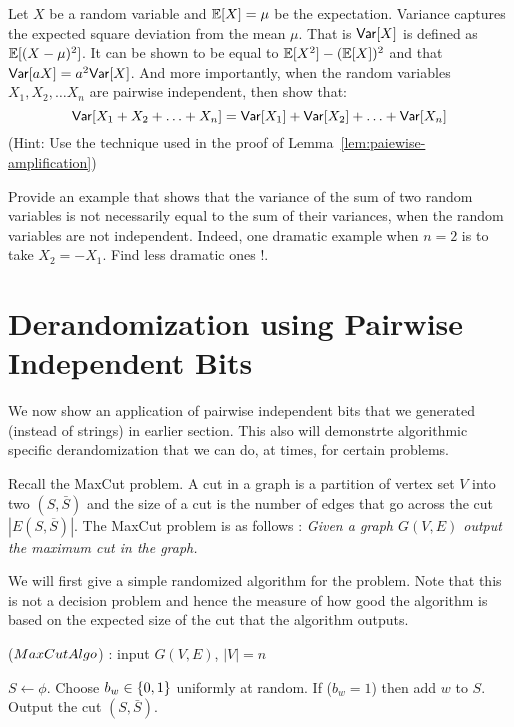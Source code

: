 \begin{exercise}
Let $X$ be a random variable and ${\mathbb E}[X] = \mu$ be the expectation. Variance captures the expected square deviation from the mean $\mu$. That is $\mathsf{Var}[X]$ is defined as ${\mathbb E}[(X-\mu)^2]$. It can be shown to be equal to ${\mathbb E}[X^2]-({\mathbb E}[X])^2$ and that $\mathsf{Var}[aX] = a^2\mathsf{Var}[X]$. And more importantly, when the random variables $X_1, X_2, \ldots X_n$ are pairwise independent, then show that:
$$\mathsf{Var}[X_1+X_2+\ldots+X_n] = \mathsf{Var}[X_1]+\mathsf{Var}[X_2]+\ldots+\mathsf{Var}[X_n]$$
(Hint: Use the technique used in the proof of Lemma~\ref{lem:paiewise-amplification})

Provide an example that shows that the variance of the sum of two random variables is not necessarily equal to the sum of their variances, when the random variables are not independent. Indeed, one dramatic example when $n=2$ is to take $X_2 = -X_1$. Find less dramatic ones !.
\end{exercise}


\section{Derandomization using Pairwise Independent Bits}

We now show an application of pairwise independent bits that we generated (instead of strings) in earlier section. This also will demonstrte algorithmic specific derandomization that we can do, at times, for certain problems. 

Recall the {\sc MaxCut} problem. A cut in a graph is a partition of vertex set $V$ into two $(S,\bar{S})$ and the size of a cut is the number of edges that go across the cut $|E(S,\overline{S})|$. The {\sc MaxCut} problem is as follows : \textit{Given a graph $G(V,E)$ output the maximum cut in the graph.}

We will first give a simple randomized algorithm for the problem. Note that this is not a decision problem and hence the measure of how good the algorithm is based on the expected size of the cut that the algorithm outputs.

\begin{algorithm}
\label{alg:maxcut-randomized}
\caption{(${\sc MaxCutAlgo}$) : input $G(V,E)$, $|V|=n$} 
\begin{algorithmic}[1]
\State $S \gets \phi$. 
	\State Choose $b_w \in \{0,1\}$ uniformly at random.
	\State If ($b_w = 1$) then add $w$ to $S$.
\EndFor
\State Output the cut $(S,\bar{S})$.
\end{algorithmic}
\end{algorithm}

